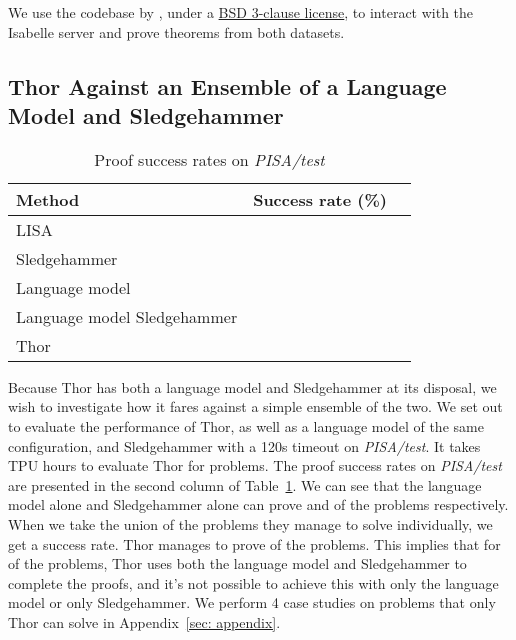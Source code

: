 \documentclass{article}
\begin{document}
We use the codebase by \citet{jiang2021lisa}, under a \href{https://github.com/albertqjiang/Portal-to-ISAbelle/blob/main/LICENSE}{BSD 3-clause license}, to interact with the Isabelle server and prove theorems from both datasets.

\subsection{Thor Against an Ensemble of a Language Model and Sledgehammer}

\begin{table}[t]
    \begin{minipage}{\linewidth}
      \centering
        \caption{Proof success rates on \emph{PISA/test}}
        \label{tab: pisa rate}
        \centering
        \begin{tabular}{lcc}
            \toprule
            Method   & Success rate (\%)\\ 
            \midrule
            LISA~\citep{jiang2021lisa} &  \\
            \midrule
            Sledgehammer &  \\
            Language model &   \\
            Language model  Sledgehammer & \\
            \midrule
            Thor & \\
            \bottomrule
        \end{tabular}
    \end{minipage}
\end{table}

Because Thor has both a language model and Sledgehammer at its disposal, we wish to investigate how it fares against a simple ensemble of the two. We set out to evaluate the performance of Thor, as well as a language model of the same configuration, and Sledgehammer with a 120s timeout on \emph{PISA/test}.
It takes  TPU hours to evaluate Thor for  problems.
The proof success rates on \emph{PISA/test} are presented in the second column of Table~\ref{tab: pisa rate}.
We can see that the language model alone and Sledgehammer alone can prove  and  of the problems respectively. When we take the union of the problems they manage to solve individually, we get a  success rate. Thor manages to prove  of the problems. This implies that for  of the problems, Thor uses both the language model and Sledgehammer to complete the proofs, and it's not possible to achieve this with only the language model or only Sledgehammer. We perform 4 case studies on problems that only Thor can solve in Appendix~\ref{sec: appendix}.
\end{document}
